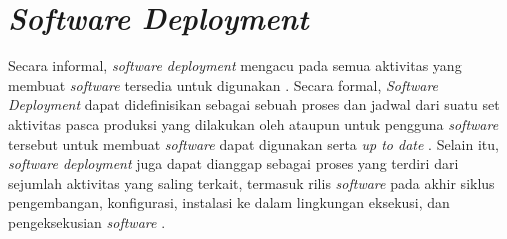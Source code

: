 \section{\textit{Software Deployment}}
Secara informal, \textit{software deployment} mengacu pada semua aktivitas yang membuat \textit{software} tersedia untuk digunakan \parencite{softwareDeploymentCarzaniga1998characterization}. Secara formal, \textit{Software Deployment} dapat didefinisikan sebagai sebuah proses dan jadwal dari suatu set aktivitas pasca produksi yang dilakukan oleh ataupun untuk pengguna \textit{software} tersebut untuk membuat \textit{software} dapat digunakan serta \textit{up to date} \parencite{ARCANGELI2015198}. Selain itu, \textit{software deployment} juga dapat dianggap sebagai proses yang terdiri dari sejumlah aktivitas yang saling terkait, termasuk rilis \textit{software} pada akhir siklus pengembangan, konfigurasi, instalasi ke dalam lingkungan eksekusi, dan pengeksekusian \textit{software} \parencite{softwareDeploymentFuturePast}.









